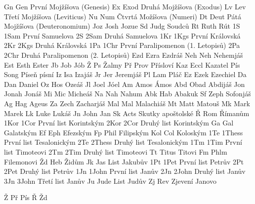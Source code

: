 \BookTitle  Gn  Gen    {První Mojžíšova (Genesis)}
\BookTitle  Ex  Exod   {Druhá Mojžíšova (Exodus)}
\BookTitle  Lv  Lev    {Třetí Mojžíšova (Leviticus)}
\BookTitle  Nu  Num    {Čtvrtá Možíšova (Numeri)}
\BookTitle  Dt  Deut   {Pátá Mojžíšova (Deuteronomium)}
\BookTitle  Joz Josh   {Jozue}
\BookTitle  Sd  Judg   {Soudců}
\BookTitle  Rt  Ruth   {Rút}
\BookTitle  1S  1Sam   {První Samuelova}
\BookTitle  2S  2Sam   {Druhá Samuelova}
\BookTitle  1Kr 1Kgs   {První Královská}
\BookTitle  2Kr 2Kgs   {Druhá Královská}
\BookTitle  1Pa 1Chr   {První Paralipomenon (1. Letopisů)}
\BookTitle  2Pa 2Chr   {Druhá Paralipomenon (2. Letopisů)}
\BookTitle  Ezd Ezra   {Ezdráš}
\BookTitle  Neh Neh    {Nehemjáš}
\BookTitle  Est Esth   {Ester}
\BookTitle  Jb  Job    {Jób}
\BookTitle  Ž   Ps     {Žalmy}
\BookTitle  Př  Prov   {Přísloví}
\BookTitle  Kaz Eccl   {Kazatel}
\BookTitle  Pís Song   {Píseň písní}
\BookTitle  Iz  Isa    {Izajáš}
\BookTitle  Jr  Jer    {Jeremjáš}
\BookTitle  Pl  Lam    {Pláč}
\BookTitle  Ez  Ezek   {Ezechiel}
\BookTitle  Da  Dan    {Daniel}
\BookTitle  Oz  Hos    {Ozeáš}
\BookTitle  Jl  Joel   {Jóel}
\BookTitle  Am  Amos   {Ámos}
\BookTitle  Abd Obad   {Abdijáš}
\BookTitle  Jon Jonah  {Jonáš}
\BookTitle  Mi  Mic    {Micheáš}
\BookTitle  Na  Nah    {Nahum}
\BookTitle  Abk Hab    {Abakuk}
\BookTitle  Sf  Zeph   {Sofonjáš}
\BookTitle  Ag  Hag    {Ageus}
\BookTitle  Za  Zech   {Zacharjáš}
\BookTitle  Mal Mal    {Malachiáš}
\BookTitle  Mt  Matt   {Matouš}
\BookTitle  Mk  Mark   {Marek}
\BookTitle  Lk  Luke   {Lukáš}
\BookTitle  Jn  John   {Jan}
\BookTitle  Sk  Acts   {Skutky apoštolské}
\BookTitle  Ř   Rom    {Římanům}
\BookTitle  1Kor 1Cor  {První list Korintským}
\BookTitle  2Kor 2Cor  {Druhý list Korintským}
\BookTitle  Ga  Gal    {Galatským}
\BookTitle  Ef  Eph    {Efezským}
\BookTitle  Fp  Phil   {Filipským}
\BookTitle  Kol Col    {Koloským}
\BookTitle  1Te 1Thess {První list Tesalonickým}
\BookTitle  2Te 2Thess {Druhý list Tesalonickým}
\BookTitle  1Tm 1Tim   {První list Timoteovi}
\BookTitle  2Tm 2Tim   {Druhý list Timoteovi}
\BookTitle  Tt  Titus  {Titovi}
\BookTitle  Fm  Phlm   {Filemonovi}
\BookTitle  Žd  Heb    {Židům}
\BookTitle  Jk  Jas    {List Jakubův}
\BookTitle  1Pt 1Pet   {První list Petrův}
\BookTitle  2Pt 2Pet   {Druhý list Petrův}
\BookTitle  1Jn 1John  {První list Janův}
\BookTitle  2Jn 2John  {Druhý list Janův}
\BookTitle  3Jn 3John  {Třetí list Janův}
\BookTitle  Ju  Jude   {List Judův}
\BookTitle  Zj  Rev    {Zjevení Janovo}     

\BookException Ž   {\def\amark{Z}}
\BookException Př  {\def\amark{Pr}}
\BookException Pís {\def\amark{Pis}}
\BookException Ř   {\def\amark{R}}
\BookException Žd  {\def\amark{Zd}}

\def\nochapbooks{Abd Fm 2Jn 3Jn Ju}
